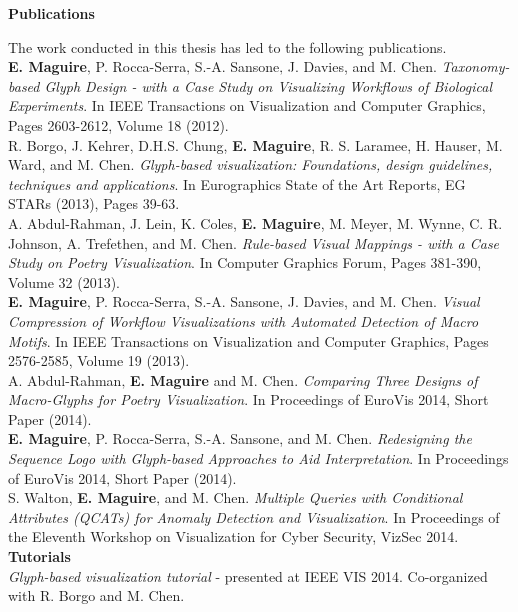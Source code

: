 \begin{publications}

\noindent\textbf{Publications}

\noindent The work conducted in this thesis has led to the following publications. \\

\noindent \textbf{E. Maguire}‚ P. Rocca-Serra‚ S.-A. Sansone‚ J. Davies, and M. Chen. \emph{Taxonomy-based Glyph Design - with a Case Study on Visualizing Workflows of Biological Experiments}. In IEEE Transactions on Visualization and Computer Graphics, Pages 2603-2612, Volume 18 (2012).\\

\noindent R. Borgo, J. Kehrer, D.H.S. Chung, \textbf{E. Maguire}, R. S. Laramee, H. Hauser, M. Ward, and M. Chen. \emph{Glyph-based visualization: Foundations, design guidelines, techniques and applications}. In Eurographics State of the Art Reports, EG STARs (2013), Pages 39-63.\\

\noindent A. Abdul-Rahman, J. Lein, K. Coles, \textbf{E. Maguire}, M. Meyer, M. Wynne, C. R. Johnson, A. Trefethen, and M. Chen. \emph{Rule-based Visual Mappings - with a Case Study on Poetry Visualization}. In Computer Graphics Forum, Pages 381-390, Volume 32 (2013).\\

\noindent \textbf{E. Maguire}‚ P. Rocca-Serra‚ S.-A. Sansone‚ J. Davies, and M. Chen. \emph{Visual Compression of Workflow Visualizations with Automated Detection of Macro Motifs}. In IEEE Transactions on Visualization and Computer Graphics, Pages 2576-2585, Volume 19 (2013).\\

\noindent A. Abdul-Rahman‚ \textbf{E. Maguire} and M. Chen. \emph{Comparing Three Designs of Macro-Glyphs for Poetry Visualization}. In Proceedings of EuroVis 2014‚ Short Paper (2014).\\

\noindent \textbf{E. Maguire}‚ P. Rocca-Serra‚ S.-A. Sansone, and M. Chen. \emph{Redesigning the Sequence Logo with Glyph-based Approaches to Aid Interpretation}. In Proceedings of EuroVis 2014‚ Short Paper (2014).\\

\noindent S. Walton, \textbf{E. Maguire}‚ and M. Chen. \emph{Multiple Queries with Conditional Attributes (QCATs) for Anomaly Detection and Visualization}. In Proceedings of the Eleventh Workshop on Visualization for Cyber Security, VizSec 2014.\\

\noindent\textbf{Tutorials}\\

\noindent \emph{Glyph-based visualization tutorial} - presented at IEEE VIS 2014. Co-organized with R. Borgo and M. Chen. 

\end{publications}
